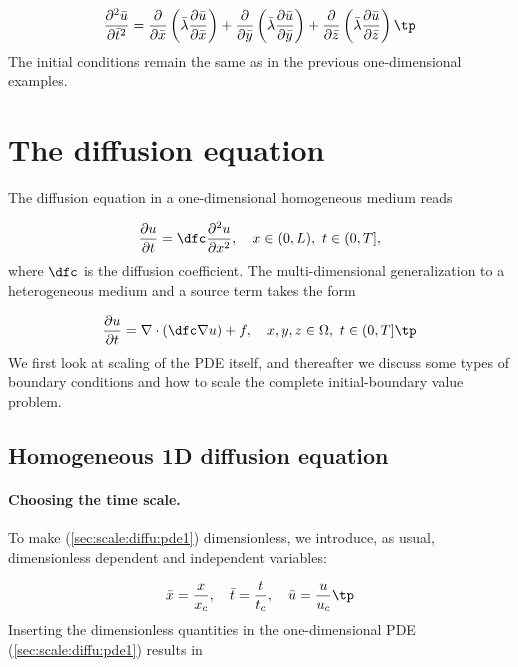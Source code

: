 \documentclass[graybox,envcountchap,sectrefs,final]{svmonodo}
\begin{document}
\begin{equation}
\frac{\partial^2 \bar u}{\partial \bar t^2} =
\frac{\partial}{\partial \bar x}\left(\bar\lambda\frac{\partial \bar u}{\partial \bar x}\right)+
\frac{\partial}{\partial \bar y}\left(\bar\lambda\frac{\partial \bar u}{\partial \bar y}\right)+
\frac{\partial}{\partial \bar z}\left(\bar\lambda\frac{\partial \bar u}{\partial \bar z}\right)\tp
\end{equation}
The initial conditions remain the same as in the previous one-dimensional
examples.

\section{The diffusion equation}
\label{sec:scale:diffu}

The diffusion equation in a one-dimensional homogeneous medium reads

\begin{equation}
\frac{\partial u}{\partial t} =
\dfc\frac{\partial^2 u}{\partial x^2}, \quad  x\in (0,L),\ t\in (0,T],
\label{sec:scale:diffu:pde1}
\end{equation}
where $\dfc$ is the diffusion coefficient. The
multi-dimensional generalization to a heterogeneous medium
and a source term takes the form

\begin{equation}
\frac{\partial u}{\partial t} =
\nabla\cdot\left(\dfc \nabla u\right) + f, \quad  x,y,z\in \Omega,\ t\in (0,T]\tp
\label{sec:scale:diffu:pde1:3D}
\end{equation}
We first look at scaling of the PDE itself, and thereafter we discuss
some types of boundary conditions and how to scale the complete
initial-boundary value problem.


\subsection{Homogeneous 1D diffusion equation}
\label{sec:scale:diffu:homo1D}

\paragraph{Choosing the time scale.}
To make (\ref{sec:scale:diffu:pde1}) dimensionless,
we introduce, as usual, dimensionless dependent and independent variables:

\[ \bar x = \frac{x}{x_c},
\quad \bar t = \frac{t}{t_c}, \quad \bar u =\frac{u}{u_c}\tp\]
Inserting the dimensionless quantities in the one-dimensional
PDE (\ref{sec:scale:diffu:pde1}) results in
\end{document}
